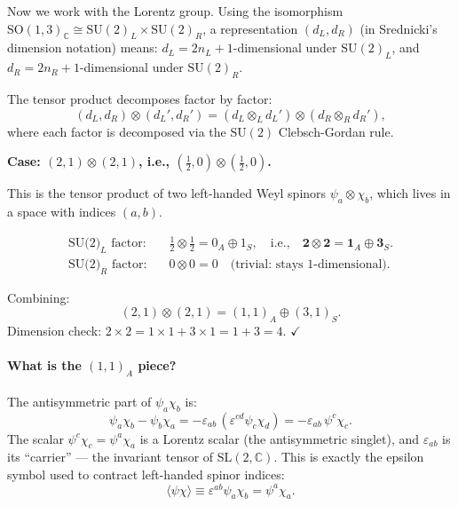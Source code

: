 \documentclass[12pt]{article}
\theoremstyle{remark}
\begin{document}
Now we work with the Lorentz group.  Using the isomorphism
$\mathrm{SO}(1,3)_\mathbb{C} \cong \mathrm{SU}(2)_L \times \mathrm{SU}(2)_R$,
a representation $(d_L, d_R)$ (in Srednicki's dimension notation) means:
$d_L = 2n_L+1$-dimensional under $\mathrm{SU}(2)_L$, and
$d_R = 2n_R+1$-dimensional under $\mathrm{SU}(2)_R$.

The tensor product decomposes factor by factor:
\begin{equation}
  (d_L, d_R) \otimes (d_L', d_R')
  = (d_L \otimes_L d_L') \otimes (d_R \otimes_R d_R'),
\end{equation}
where each factor is decomposed via the $\mathrm{SU}(2)$ Clebsch-Gordan rule.

\medskip
\noindent\textbf{Case: $(2,1)\otimes(2,1)$, i.e., $(\tfrac{1}{2},0)\otimes(\tfrac{1}{2},0)$.}

This is the tensor product of two left-handed Weyl spinors $\psi_a \otimes \chi_b$,
which lives in a space with indices $(a,b)$.

\begin{align*}
  \text{SU(2)}_L\text{ factor:} &\quad
  \tfrac{1}{2}\otimes\tfrac{1}{2} = 0_A \oplus 1_S,
  \quad\text{i.e.,}\quad \mathbf{2}\otimes\mathbf{2} = \mathbf{1}_A \oplus \mathbf{3}_S.\\[3pt]
  \text{SU(2)}_R\text{ factor:} &\quad
  0\otimes 0 = 0\quad\text{(trivial: stays 1-dimensional).}
\end{align*}

Combining:
\begin{equation}
  \boxed{(2,1)\otimes(2,1) = (1,1)_A \oplus (3,1)_S.}
  \label{eq:21x21}
\end{equation}
Dimension check: $2\times 2 = 1\times 1 + 3\times 1 = 1 + 3 = 4$. $\checkmark$

\paragraph{What is the $(1,1)_A$ piece?}
The antisymmetric part of $\psi_a\chi_b$ is:
\[
  \psi_a\chi_b - \psi_b\chi_a
  = -\varepsilon_{ab}\,(\varepsilon^{cd}\psi_c\chi_d)
  = -\varepsilon_{ab}\,\psi^c\chi_c.
\]
The scalar $\psi^c\chi_c = \psi^a\chi_a$ is a Lorentz scalar (the antisymmetric
singlet), and $\varepsilon_{ab}$ is its ``carrier'' --- the invariant tensor
of $\mathrm{SL}(2,\mathbb{C})$.  This is exactly the epsilon symbol used to
contract left-handed spinor indices:
\[
  \langle\psi\chi\rangle \equiv \varepsilon^{ab}\psi_a\chi_b = \psi^a\chi_a.
\]
\end{document}
